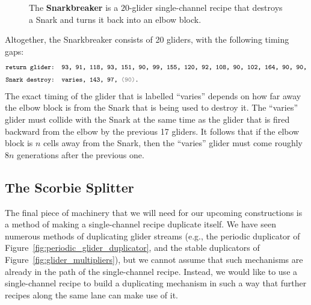 \begin{figure}[!htb]
	\centering
	
	\caption{The \textbf{Snarkbreaker} is a $20$-glider single-channel recipe that destroys a Snark and turns it back into an elbow block.}\label{fig:snarkbreaker}
\end{figure}

Altogether, the Snarkbreaker consists of 20 gliders, with the following timing gaps:
\begin{align*}
& \text{\texttt{\footnotesize return glider: {\footnotesize 93, 91, 118, 93, 151, 90, 99, 155, 120, 92, 108, 90, 102, 164, 90, 90,}}} \\
& \text{\texttt{\footnotesize Snark destroy: {\footnotesize varies, 143, 97, {\color{gray}(90)}.}}}
\end{align*}
The exact timing of the glider that is labelled ``varies'' depends on how far away the elbow block is from the Snark that is being used to destroy it. The ``varies'' glider must collide with the Snark at the same time as the glider that is fired backward from the elbow by the previous 17 gliders. It follows that if the elbow block is $n$ cells away from the Snark, then the ``varies'' glider must come roughly $8n$ generations after the previous one.



\subsection{The Scorbie Splitter}\label{sec:scorbie_splitter}

The final piece of machinery that we will need for our upcoming constructions is a method of making a single-channel recipe duplicate itself. We have seen numerous methods of duplicating glider streams (e.g., the periodic duplicator of Figure~\ref{fig:periodic_glider_duplicator}, and the stable duplicators of Figure~\ref{fig:glider_multipliers}), but we cannot assume that such mechanisms are already in the path of the single-channel recipe. Instead, we would like to use a single-channel recipe to build a duplicating mechanism in such a way that further recipes along the same lane can make use of it.

